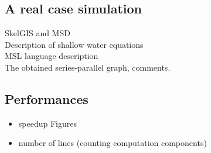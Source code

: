 \subsection{A real case simulation}
SkelGIS and MSD\\
Description of shallow water equations\\
MSL language description\\
The obtained series-parallel graph, comments.

\subsection{Performances}
\begin{itemize}
\item speedup Figures
\item number of lines (counting computation components)
\end{itemize}